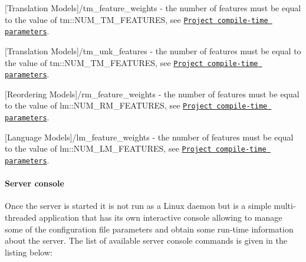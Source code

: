 \begin{DoxyItemize}
\item {\ttfamily \mbox{[}Translation Models\mbox{]}/tm\+\_\+feature\+\_\+weights} -\/ the number of features must be equal to the value of {\ttfamily tm\+::\+N\+U\+M\+\_\+\+T\+M\+\_\+\+F\+E\+A\+T\+U\+R\+E\+S}, see \href{#project-compile-time-parameters}{\tt Project compile-\/time parameters}.
\item {\ttfamily \mbox{[}Translation Models\mbox{]}/tm\+\_\+unk\+\_\+features} -\/ the number of features must be equal to the value of {\ttfamily tm\+::\+N\+U\+M\+\_\+\+T\+M\+\_\+\+F\+E\+A\+T\+U\+R\+E\+S}, see \href{#project-compile-time-parameters}{\tt Project compile-\/time parameters}.
\item {\ttfamily \mbox{[}Reordering Models\mbox{]}/rm\+\_\+feature\+\_\+weights} -\/ the number of features must be equal to the value of {\ttfamily lm\+::\+N\+U\+M\+\_\+\+R\+M\+\_\+\+F\+E\+A\+T\+U\+R\+E\+S}, see \href{#project-compile-time-parameters}{\tt Project compile-\/time parameters}.
\item {\ttfamily \mbox{[}Language Models\mbox{]}/lm\+\_\+feature\+\_\+weights} -\/ the number of features must be equal to the value of {\ttfamily lm\+::\+N\+U\+M\+\_\+\+L\+M\+\_\+\+F\+E\+A\+T\+U\+R\+E\+S}, see \href{#project-compile-time-parameters}{\tt Project compile-\/time parameters}.
\end{DoxyItemize}

\paragraph*{Server console}

Once the server is started it is not run as a Linux daemon but is a simple multi-\/threaded application that has its own interactive console allowing to manage some of the configuration file parameters and obtain some run-\/time information about the server. The list of available server console commands is given in the listing below\+:


